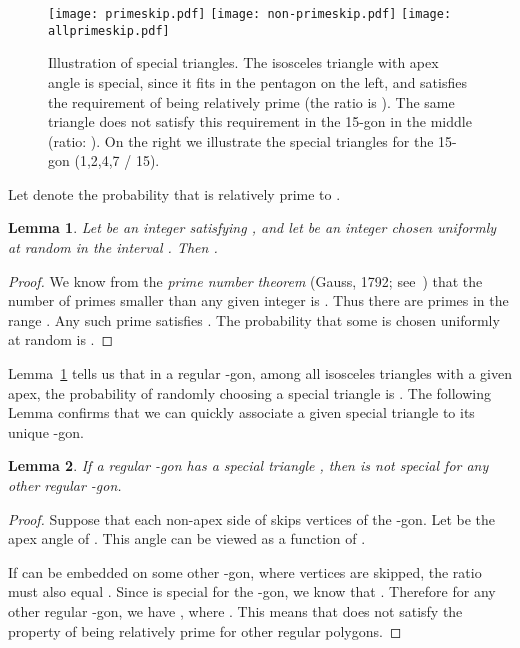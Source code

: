 \documentclass{article}
\newtheorem{lemma}{Lemma}
\begin{document}
\begin{figure}[h!]
\center
\texttt{[image: primeskip.pdf]}
\texttt{[image: non-primeskip.pdf]}
\texttt{[image: allprimeskip.pdf]}
\caption{Illustration of special triangles. The isosceles triangle with apex angle  is special, since it fits in the pentagon on the left, and satisfies the requirement of being relatively prime (the ratio is ).  
The same triangle does not satisfy this requirement in the 15-gon in the middle (ratio: ).   On the right
we illustrate the special triangles for the 15-gon (1,2,4,7 / 15).}
\label{fig:special}
\end{figure}


\noindent Let  denote the probability that  is relatively prime to .
\begin{lemma}
\label{relativelyprimelemma} Let  be an integer satisfying , and let  be
an  integer chosen uniformly at random in the interval 
.  
  Then  .
\end{lemma}
\begin{proof}
We know from the {\em prime number theorem} (Gauss, 1792;
see~\cite{havil})
that the number of primes smaller than
any given integer  is . 
Thus there are   primes in the
range .   Any such prime   satisfies .
The probability that some  is chosen uniformly at random is 
.
\end{proof}
Lemma~\ref{relativelyprimelemma} tells us that in a regular -gon, among all isosceles 
triangles with a given apex, the probability of randomly choosing a special triangle is
.
The following Lemma confirms that we can quickly associate a given special triangle to its
unique -gon.
\begin{lemma}
\label{lem:unique}
If a regular -gon has a special triangle , then  is not special for any other regular -gon.
\end{lemma}
\begin{proof}
Suppose that each non-apex side of  skips  vertices of the -gon.
Let  be the apex angle of .  This angle can be viewed as a function of .

If  can be embedded on some other -gon, where  vertices are skipped, 
the ratio  must also equal .
Since  is special for the -gon, we know that .  Therefore for any other
regular -gon, we have , where .  This means that
 does not satisfy the property of being relatively prime for other regular polygons.
\end{proof}
\end{document}
